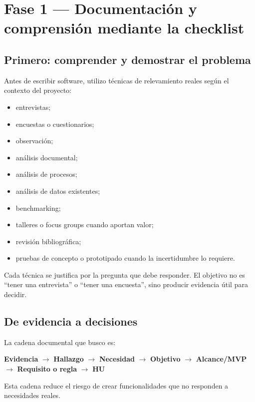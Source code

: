 \documentclass[11pt,a4paper]{article}
\begin{document}
\section{Fase 1 — Documentación y comprensión mediante la checklist}

\subsection{Primero: comprender y demostrar el problema}

Antes de escribir software, utilizo técnicas de relevamiento reales según el contexto del proyecto:

\begin{itemize}
    \item entrevistas;
    \item encuestas o cuestionarios;
    \item observación;
    \item análisis documental;
    \item análisis de procesos;
    \item análisis de datos existentes;
    \item benchmarking;
    \item talleres o focus groups cuando aportan valor;
    \item revisión bibliográfica;
    \item pruebas de concepto o prototipado cuando la incertidumbre lo requiere.
\end{itemize}

Cada técnica se justifica por la pregunta que debe responder. El objetivo no es ``tener una entrevista'' o ``tener una encuesta'', sino producir evidencia útil para decidir.

\subsection{De evidencia a decisiones}

La cadena documental que busco es:

\begin{center}
\textbf{Evidencia}
\(\rightarrow\)
\textbf{Hallazgo}
\(\rightarrow\)
\textbf{Necesidad}
\(\rightarrow\)
\textbf{Objetivo}
\(\rightarrow\)
\textbf{Alcance/MVP}
\(\rightarrow\)
\textbf{Requisito o regla}
\(\rightarrow\)
\textbf{HU}
\end{center}

Esta cadena reduce el riesgo de crear funcionalidades que no responden a necesidades reales.
\end{document}
